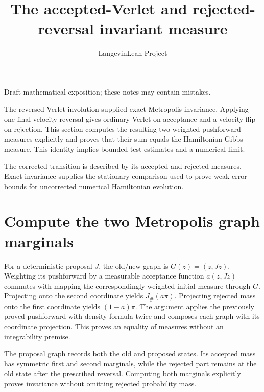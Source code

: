 \documentclass[11pt,a4paper]{article}
\title{\texorpdfstring{The accepted-Verlet and rejected-reversal invariant measure}{The accepted-Verlet and rejected-reversal invariant measure}}
\author{LangevinLean Project}
\date{}
\begin{document}
\maketitle
Draft mathematical exposition; these notes may contain mistakes.


The reversed-Verlet involution supplied exact Metropolis invariance. Applying one final velocity reversal gives ordinary Verlet on acceptance and a velocity flip on rejection. This section computes the resulting two weighted pushforward measures explicitly and proves that their sum equals the Hamiltonian Gibbs measure. This identity implies bounded-test estimates and a numerical limit.



The corrected transition is described by its accepted and rejected measures. Exact invariance supplies the stationary comparison used to prove weak error bounds for uncorrected numerical Hamiltonian evolution.


\section{\texorpdfstring{Compute the two Metropolis graph marginals}{Compute the two Metropolis graph marginals}}


For a deterministic proposal \(J\), the old/\allowbreak{}new graph is \(G(z)=(z,Jz)\). Weighting its pushforward by a measurable acceptance function \(a(z,Jz)\) commutes with mapping the correspondingly weighted initial measure through \(G\). Projecting onto the second coordinate yields \(J_\#(a\pi)\). Projecting rejected mass onto the first coordinate yields \((1-a)\pi\). The argument applies the previously proved pushforward-with-density formula twice and composes each graph with its coordinate projection. This proves an equality of measures without an integrability premise.



The proposal graph records both the old and proposed states. Its accepted mass has symmetric first and second marginals, while the rejected part remains at the old state after the prescribed reversal. Computing both marginals explicitly proves invariance without omitting rejected probability mass.
\end{document}
